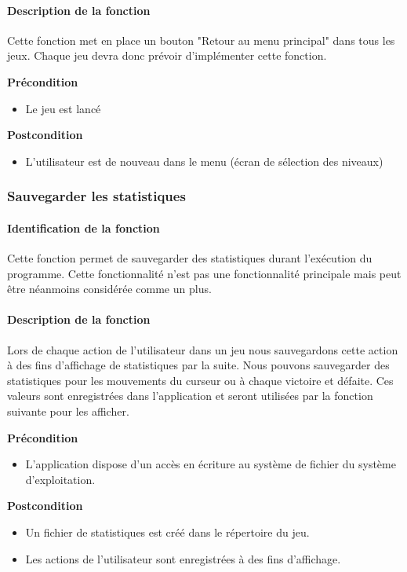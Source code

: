 \documentclass{polytech/polytech}
\begin{document}
\paragraph{Description de la fonction}
Cette fonction met en place un bouton "Retour au menu principal" dans tous les jeux. Chaque jeu devra donc prévoir d'implémenter cette fonction.

\textbf{Précondition}
\begin{itemize}
\item Le jeu est lancé
\end{itemize}

\textbf{Postcondition}
\begin{itemize}
\item L'utilisateur est de nouveau dans le menu (écran de sélection des niveaux)
\end{itemize}

\subsubsection{Sauvegarder les statistiques}
\paragraph{Identification de la fonction}
Cette fonction permet de sauvegarder des statistiques durant l'exécution du programme. Cette fonctionnalité n'est pas une fonctionnalité principale mais peut être néanmoins considérée comme un plus. 
\paragraph{Description de la fonction}
Lors de chaque action de l'utilisateur dans un jeu nous sauvegardons cette action à des fins d'affichage de statistiques par la suite. Nous pouvons sauvegarder des statistiques pour  les mouvements du curseur ou à chaque victoire et défaite. Ces valeurs sont enregistrées dans l'application et seront utilisées par la fonction suivante pour les afficher.

\textbf{Précondition}
\begin{itemize}
\item L'application dispose d'un accès en écriture au système de fichier du système d'exploitation.
\end{itemize}

\textbf{Postcondition}
\begin{itemize}
\item Un fichier de statistiques est créé dans le répertoire du jeu.
\item Les actions de l'utilisateur sont enregistrées à des fins d'affichage.
\end{itemize}
\end{document}
